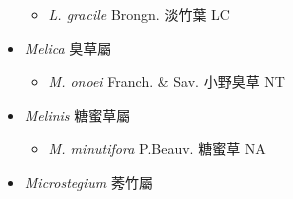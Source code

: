 \begin{itemize}
  \begin{itemize}
        \item[] \textit{L. gracile} Brongn.  淡竹葉   LC
  \end{itemize}
 \item[] \textit{Melica} 臭草屬
                                
  \begin{itemize}
        \item[] \textit{M. onoei} Franch. \& Sav.  小野臭草   NT
  \end{itemize}
 \item[] \textit{Melinis} 糖蜜草屬
                                
  \begin{itemize}
        \item[] \textit{M. minutifora} P.Beauv.  糖蜜草   NA
  \end{itemize}
 \item[] \textit{Microstegium} 莠竹屬
                                

\end{itemize}
